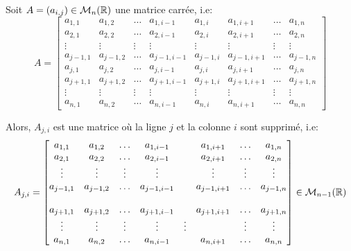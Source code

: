 \begin{definition}
    Soit $A = (a_{i, j}) \in \mathcal{M}_n(\mathbb{R})$ une matrice carrée, i.e:
    \[
        A = 
        \begin{bmatrix} 
            a_{1, 1} & a_{1, 2} & \ldots & a_{1, i - 1} & a_{1, i} & a_{1, i+1} & \ldots & a_{1, n} \\
            a_{2, 1} & a_{2, 2} & \ldots & a_{2, i - 1} & a_{2, i} & a_{2, i+1} & \ldots & a_{2, n} \\
            \vdots   & \vdots   & \vdots & \vdots       & \vdots   & \vdots     & \vdots & \vdots \\
            a_{j-1, 1} & a_{j-1, 2} & \ldots & a_{j-1, i - 1} & a_{j-1, i} & a_{j-1, i+1} & \ldots & a_{j-1, n} \\
            a_{j, 1} & a_{j, 2} & \ldots & a_{j, i - 1} & a_{j, i} & a_{j, i+1} & \ldots & a_{j, n} \\
            a_{j+1, 1} & a_{j+1, 2} & \ldots & a_{j+1, i - 1} & a_{j+1, i} & a_{j+1, i+1} & \ldots & a_{j+1, n} \\
            \vdots   & \vdots   & \vdots & \vdots       & \vdots   & \vdots     & \vdots & \vdots \\
            a_{n, 1} & a_{n, 2} & \ldots & a_{n, i - 1} & a_{n, i} & a_{n, i+1} & \ldots & a_{n, n} 
        \end{bmatrix} 
    \] 

    Alors, $A_{j, i}$ est une matrice où la ligne $j$ et la colonne  $i$ sont supprimé, i.e:
    \[
        A_{j, i} = 
        \begin{bmatrix} 
            a_{1, 1} & a_{1, 2} & \ldots & a_{1, i - 1} & & a_{1, i+1} & \ldots & a_{1, n} \\
            a_{2, 1} & a_{2, 2} & \ldots & a_{2, i - 1} & & a_{2, i+1} & \ldots & a_{2, n} \\
            \vdots   & \vdots   & \vdots & \vdots       & & \vdots     & \vdots & \vdots \\
           a_{j-1, 1} & a_{j-1, 2} & \ldots & a_{j-1, i - 1} & & a_{j-1, i+1} & \ldots & a_{j-1, n} \\
             & & & & & & & \\
            a_{j+1, 1} & a_{j+1, 2} & \ldots & a_{j+1, i - 1} & & a_{j+1, i+1} & \ldots & a_{j+1, n} \\
            \vdots   & \vdots   & \vdots & \vdots       & \vdots   & & \vdots & \vdots \\
            a_{n, 1} & a_{n, 2} & \ldots & a_{n, i - 1} & & a_{n, i+1} & \ldots & a_{n, n} 
        \end{bmatrix} \in \mathcal{M}_{n-1}(\mathbb{R})
    \] 
\end{definition}

